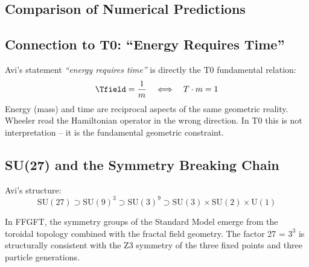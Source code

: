 \subsection{Comparison of Numerical Predictions}

\begin{center}
{\footnotesize{}}
\end{center}

\subsection{Connection to T0: ``Energy Requires Time''}

Avi's statement \textit{``energy requires time''} is directly the T0 fundamental relation:
\begin{equation}
  \Tfield = \frac{1}{m} \quad \Longleftrightarrow \quad T \cdot m = 1
\end{equation}
Energy (mass) and time are reciprocal aspects of the same geometric reality. Wheeler read the Hamiltonian operator in the wrong direction. In T0 this is not interpretation -- it is the fundamental geometric constraint.

\subsection{SU(27) and the Symmetry Breaking Chain}

Avi's structure:
\begin{equation}
  \text{SU}(27) \supset \text{SU}(9)^3 \supset \text{SU}(3)^9 \supset \text{SU}(3) \times \text{SU}(2) \times \text{U}(1)
\end{equation}

In FFGFT, the symmetry groups of the Standard Model emerge from the toroidal topology combined with the fractal field geometry. The factor 27 = $3^3$ is structurally consistent with the Z3 symmetry of the three fixed points and three particle generations.

